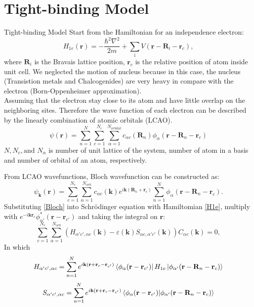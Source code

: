 \documentclass{beamer}
\begin{document}
\section{Tight-binding Model}
\begin{frame}{Tight-binding Model}
\quad Start from the Hamiltonian for an independence electron:
\begin{equation}
	\label{H1e}
	H_{1e}(\textbf{r}) = -\frac{\hbar^2 \nabla^2}{2m} + \sum_{\text{i}} V(\textbf{r} - \textbf{R}_\text{i} -\textbf{r}_c),
\end{equation}
\quad where $\textbf{R}_i$ is the Bravais lattice position, $\textbf{r}_c$ is the relative position of atom inside unit cell. We neglected the motion of nucleus because in this case, the nucleus (Transistion metals and Chalcogenides) are very heavy in compare with the electron (Born-Oppenheimer approximation).\\\null\quad Assuming that the electron stay close to its atom and have little overlap on the neighboring sites. Therefore the wave function of each electron can be described by the linearly combination of atomic orbitals (LCAO).
\begin{equation}
	\label{key}
	\psi (\textbf{r}) = \sum_{n=1}^N \sum_{c = 1}^{N_c} \sum_{\alpha = 1}^{N_{orbital}} c_{\alpha c}(\textbf{R}_n) \phi_{\alpha}(\textbf{r}-\textbf{R}_n -\textbf{r}_c)
\end{equation}
$N, N_c, \text{and } N_{\alpha}$ is number of unit lattice of the system, number of atom in a basis and number of orbital of an atom, respectively.
\end{frame}
\begin{frame}
	From LCAO wavefunctions, Bloch wavefunction can be constructed as:
	\begin{equation}
\label{Bloch}
\psi_{\textbf{k}}(\textbf{r}) = \sum_{c = 1}^{N_c} \sum_{\alpha = 1}^{N_{orb}}c_{\alpha c}(\textbf{k}) e^{i\textbf{k}(\textbf{R}_n + \textbf{r}_c)} \sum_{n = 1}^N \phi_{\alpha}(\textbf{r} - \textbf{R}_n -\textbf{r}_c).
	\end{equation}
Substituting \eqref{Bloch} into Schrödinger equation with Hamiltomian \eqref{H1e}, multiply with $e^{-i\textbf{k}\textbf{r}_c} \phi^*_{\alpha'}(\textbf{r} - \textbf{r}_{c'})$ and taking the integral on $\textbf{r}$:
\begin{equation}
\label{TB full}
\sum_{c = 1}^{N_c} \sum_{\alpha = 1}^{N_{orb}}
(H_{\alpha'c',\alpha c}(\textbf{k}) -\varepsilon(\textbf{k})S_{\alpha c,\alpha'c'}(\textbf{k}))C_{\alpha c}(\textbf{k}) =0,
\end{equation}
In which
\begin{equation}
\label{H element def}
H_{\alpha' c', \alpha c} = \sum_{n = 1}^N e^{i\textbf{k}(\textbf{r} + \textbf{r}_c -\textbf{r}_{c'})} \bra{\phi_{\alpha}(\textbf{r} - \textbf{r}_{c'})}H_{1e} \ket{\phi_{\alpha'}(\textbf{r} -\textbf{R}_n -\textbf{r}_c)}
\end{equation}
\begin{equation}
	S_{\alpha' c', \alpha c} = \sum_{n = 1}^N e^{i\textbf{k}(\textbf{r} + \textbf{r}_c -\textbf{r}_{c'})} \bra{\phi_{\alpha}(\textbf{r} - \textbf{r}_{c'})} \ket{\phi_{\alpha'}(\textbf{r} -\textbf{R}_n -\textbf{r}_c)}
\end{equation}
\end{frame}
\end{document}
